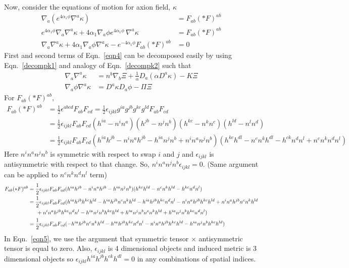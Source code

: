 \documentclass[prd]{revtex4}
\begin{document}
Now, consider the equations of motion for axion field, $\kappa$
\begin{align}
\label{eqn4}
\nabla_a \left(e^{4 \alpha_1 \phi} \nabla^a \kappa \right) &= F_{ab} (\ast F)^{ab} \nonumber \\
 e^{4 \alpha_1 \phi} \nabla_a \nabla^a \kappa + 4 \alpha_1 \nabla_a \phi e^{4 \alpha_1 \phi} \, \nabla^a \kappa &= F_{ab} (\ast F)^{ab} \nonumber \\
\nabla_a \nabla^a \kappa + 4 \alpha_1 \nabla_a \phi \nabla^a \kappa  - e^{-4 \alpha_1 \phi} F_{ab} (\ast F)^{ab}  &=0 
\end{align}
First and second terms of Eqn.~\ref{eqn4} can be decomposed easily by using Eqn.~\ref{decompk1} and analogy of Eqn.~\ref{decompk2} such that
\begin{align}
\nabla_a \nabla^a \kappa &= n^b \nabla_b \Xi + \frac{1}{\alpha} D_a (\alpha D^a \kappa) - K \Xi \nonumber \\
\nabla_a \phi \nabla^a \kappa &= D^a \kappa D_a \phi - \Pi \Xi \nonumber
\end{align}
For $F_{ab}(\ast F)^{ab}$,
\begin{align}
F_{ab}(\ast F)^{ab} &= \frac{1}{2} \epsilon^{abcd} F_{ab} F_{cd} = \frac{1}{2} \epsilon_{ijkl} g^{ia} g^{jb} g^{kc} g^{ld} F_{ab} F_{cd} \nonumber \\
	& = \frac{1}{2} \epsilon_{ijkl} F_{ab} F_{cd} (h^{ia} - n^i n^a)(h^{jb} - n^j n^b)(h^{kc} - n^k n^c)(h^{ld} - n^l n^d) \nonumber \\
	& = \frac{1}{2} \epsilon_{ijkl} F_{ab} F_{cd} (h^{ia} h^{jb} - n^i n^a h^{jb} - h^{ia} n^j n^b  + n^i n^a n^j n^b)(h^{kc} h^{dl} - n^c n^k h^{dl} - h^{ck} n^d n^l + n^c n^k n^d n^l) \nonumber
\end{align}
Here $n^i n^a n^j n^b$ is symmetric with respect to swap $i$ and $j$ and $\epsilon_{ijkl}$ is antisymmetric with respect to that change. So, $n^i n^a n^j n^b \epsilon_{ijkl}=0$. (Same argument can be applied to $n^c n^k n^d n^l$ term)
\begin{align}
F_{ab}(\ast F)^{ab} &= \frac{1}{2} \epsilon_{ijkl} F_{ab} F_{cd} (h^{ia} h^{jb} - n^i n^a h^{jb} - h^{ia} n^j n^b  )(h^{kc} h^{ld} - n^c n^k h^{ld} - h^{kc} n^d n^l ) \nonumber \\
			      &= \frac{1}{2} \epsilon_{ijkl} F_{ab} F_{cd} (h^{ia} h^{jb} h^{kc} h^{ld} - h^{ia} h^{jb} n^c n^k h^{ld} - h^{ia} h^{jb} h^{kc} n^d n^l -n^i n^a h^{jb} h^{kc} h^{ld} + n^i n^a h^{jb} n^c n^k h^{ld} \nonumber \\
			      &\indent + n^i n^a h^{jb} h^{kc} n^d n^l - h^{ia} n^j n^b h^{kc} h^{ld} + h^{ia} n^j n^b n^c n^k h^{ld} + h^{ia} n^j n^b h^{kc} n^d n^l) \label{eqn5} \\ 
			      &=\frac{1}{2} \epsilon_{ijkl} F_{ab} F_{cd} (- h^{ia} h^{jb} n^c n^k h^{ld} - h^{ia} h^{jb} h^{kc} n^d n^l -n^i n^a h^{jb} h^{kc} h^{ld}- h^{ia} n^j n^b h^{kc} h^{ld} ) 
\end{align}
In Eqn.~\ref{eqn5}, we use the argument that symmetric tensor $\times$ antisymmetric tensor is equal to zero. Also, $\epsilon_{ijkl}$ is 4 dimensional objects and induced metric is 3 dimensional objects so $\epsilon_{ijkl} h^{ia} h^{jb} h^{ck} h^{dl} = 0$ in any combinations of spatial indices.
\end{document}

